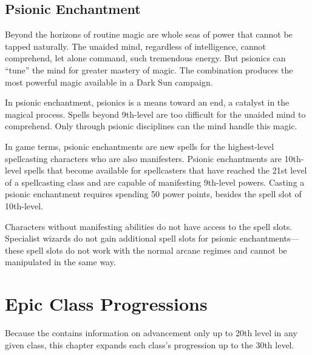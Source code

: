 

\subsection{Psionic Enchantment}
Beyond the horizons of routine magic are whole seas of power that cannot be tapped naturally. The unaided mind, regardless of intelligence, cannot comprehend, let alone command, such tremendous energy. But psionics can ``tune'' the mind for greater mastery of magic. The combination produces the most powerful magic available in a {\tableheader Dark Sun} campaign.

In psionic enchantment, psionics is a means toward an end, a catalyst in the magical process. Spells beyond 9th-level are too difficult for the unaided mind to comprehend. Only through psionic disciplines can the mind handle this magic.

In game terms, psionic enchantments are new spells for the highest-level spellcasting characters who are also manifesters. Psionic enchantments are 10th-level spells that become available for spellcasters that have reached the 21st level of a spellcasting class and are capable of manifesting 9th-level powers. Casting a psionic enchantment requires spending 50 power points, besides the spell slot of 10th-level.

Characters without manifesting abilities do not have access to the spell slots. Specialist wizards do not gain additional spell slots for psionic enchantments---these spell slots do not work with the normal arcane regimes and cannot be manipulated in the same way.

\section{Epic Class Progressions}
Because the  contains information on advancement only up to 20th level in any given class, this chapter expands each class's progression up to the 30th level.






